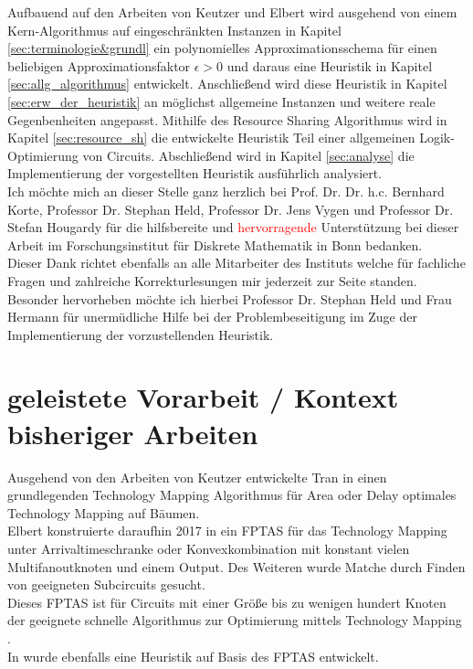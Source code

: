\documentclass[11pt, a4paper, german]{article}
\newcommand{\TM}{Technology  Mapping }
\begin{document}
Aufbauend auf den Arbeiten von Keutzer \cite{DAGON} und  Elbert \cite{Elbert} wird ausgehend von einem Kern-Algorithmus auf eingeschränkten Instanzen in Kapitel \ref{sec:terminologie&grundl} ein polynomielles Approximationsschema für einen beliebigen Approximationsfaktor $\epsilon > 0$ und daraus eine Heuristik in Kapitel \ref{sec:allg_algorithmus} entwickelt. Anschließend wird diese Heuristik  in Kapitel \ref{sec:erw_der_heuristik} an möglichst allgemeine Instanzen und weitere reale Gegenbenheiten angepasst. Mithilfe des Resource Sharing Algorithmus wird in Kapitel \ref{sec:resource_sh} die entwickelte Heuristik Teil einer allgemeinen Logik-Optimierung von Circuits. Abschließend wird in Kapitel \ref{sec:analyse} die Implementierung der vorgestellten Heuristik ausführlich analysiert.\\

Ich m\"ochte mich an dieser Stelle ganz herzlich bei Prof. Dr. Dr. h.c. Bernhard Korte, Professor Dr. Stephan Held, Professor Dr. Jens Vygen und Professor Dr. Stefan Hougardy f\"ur die hilfsbereite und \textcolor{red}{hervorragende} Unterst\"utzung bei dieser Arbeit im Forschungsinstitut f\"ur Diskrete Mathematik in Bonn bedanken.\\
Dieser Dank richtet ebenfalls an alle Mitarbeiter des Instituts welche f\"ur fachliche Fragen und zahlreiche Korrekturlesungen mir jederzeit zur Seite standen.\\
Besonder hervorheben m\"ochte ich hierbei Professor Dr. Stephan Held und Frau Hermann f\"ur unerm\"udliche Hilfe bei der Problembeseitigung im Zuge der Implementierung der vorzustellenden Heuristik.
\section{geleistete Vorarbeit / Kontext bisheriger Arbeiten}
Ausgehend von den Arbeiten von Keutzer \cite{DAGON} entwickelte Tran in \cite{Tran} einen grundlegenden \TM Algorithmus f\"ur Area oder Delay optimales \TM auf B\"aumen.\\
Elbert konstruierte daraufhin 2017 in \cite{Elbert} ein FPTAS f\"ur das \TM unter Arrivaltimeschranke oder Konvexkombination mit konstant vielen Multifanoutknoten und einem Output. Des Weiteren wurde Matche durch Finden von geeigneten Subcircuits gesucht.\\
Dieses FPTAS ist f\"ur Circuits mit einer Gr\"o{\ss}e bis zu wenigen hundert Knoten der geeignete schnelle Algorithmus zur Optimierung mittels \TM.\\
In \cite{Elbert} wurde ebenfalls eine Heuristik auf Basis des FPTAS entwickelt. 
\end{document}

